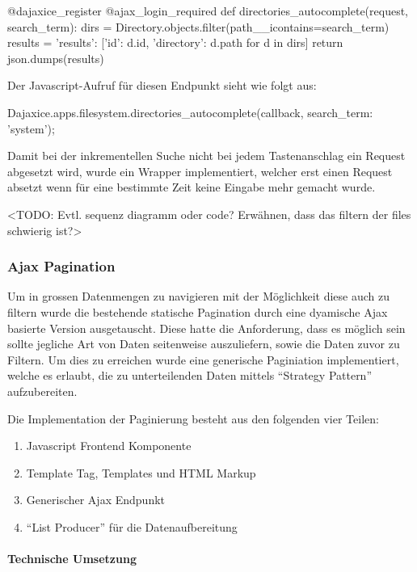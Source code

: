\begin{pythoncode}
@dajaxice_register
@ajax_login_required
def directories_autocomplete(request, search_term):
    dirs = Directory.objects.filter(path__icontains=search_term)
    results = {'results': [{'id': d.id, 'directory': d.path} for d in dirs]}
    return json.dumps(results)
\end{pythoncode}

Der Javascript-Aufruf für diesen Endpunkt sieht wie folgt aus:

\begin{jscode}
Dajaxice.apps.filesystem.directories_autocomplete(callback, {search_term: 'system'});
\end{jscode} 

Damit bei der inkrementellen Suche nicht bei jedem Tastenanschlag ein Request
abgesetzt wird, wurde ein Wrapper implementiert, welcher erst einen Request
absetzt wenn für eine bestimmte Zeit keine Eingabe mehr gemacht wurde.

<TODO: Evtl. sequenz diagramm oder code? Erwähnen, dass das filtern der files schwierig ist?>

\subsubsection{Ajax Pagination}
Um in grossen Datenmengen zu navigieren mit der Möglichkeit diese auch zu
filtern wurde die bestehende statische Pagination durch eine dyamische Ajax
basierte Version ausgetauscht. Diese hatte die Anforderung, dass es möglich sein
sollte jegliche Art von Daten seitenweise auszuliefern, sowie die Daten zuvor zu
Filtern. Um dies zu erreichen wurde eine generische Paginiation implementiert,
welche es erlaubt, die zu unterteilenden Daten mittels \enquote{Strategy
Pattern}\cite{gamma1994design} aufzubereiten.

Die Implementation der Paginierung besteht aus den folgenden vier Teilen:
\begin{enumerate}
	\item Javascript Frontend Komponente
	\item Template Tag, Templates und HTML Markup
	\item Generischer Ajax Endpunkt
	\item \enquote{List Producer} für die Datenaufbereitung
\end{enumerate}



\paragraph{Technische Umsetzung} \hspace{0pt} \\


